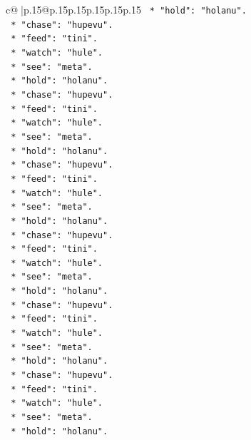 \documentclass{article}
\begin{document}
{\begin{supertabular}{c@{$\;$}|p{.15\linewidth}@{}p{.15\linewidth}p{.15\linewidth}p{.15\linewidth}p{.15\linewidth}p{.15\linewidth}}
{{{\texttt{            *   "hold": "holanu".} \\
\texttt{            *   "chase": "hupevu".} \\
\texttt{            *   "feed": "tini".} \\
\texttt{            *   "watch": "hule".} \\
\texttt{            *   "see": "meta".} \\
\texttt{            *   "hold": "holanu".} \\
\texttt{            *   "chase": "hupevu".} \\
\texttt{            *   "feed": "tini".} \\
\texttt{            *   "watch": "hule".} \\
\texttt{            *   "see": "meta".} \\
\texttt{            *   "hold": "holanu".} \\
\texttt{            *   "chase": "hupevu".} \\
\texttt{            *   "feed": "tini".} \\
\texttt{            *   "watch": "hule".} \\
\texttt{            *   "see": "meta".} \\
\texttt{            *   "hold": "holanu".} \\
\texttt{            *   "chase": "hupevu".} \\
\texttt{            *   "feed": "tini".} \\
\texttt{            *   "watch": "hule".} \\
\texttt{            *   "see": "meta".} \\
\texttt{            *   "hold": "holanu".} \\
\texttt{            *   "chase": "hupevu".} \\
\texttt{            *   "feed": "tini".} \\
\texttt{            *   "watch": "hule".} \\
\texttt{            *   "see": "meta".} \\
\texttt{            *   "hold": "holanu".} \\
\texttt{            *   "chase": "hupevu".} \\
\texttt{            *   "feed": "tini".} \\
\texttt{            *   "watch": "hule".} \\
\texttt{            *   "see": "meta".} \\
\texttt{            *   "hold": "holanu".} \\
}}}
\end{supertabular}}
\end{document}
